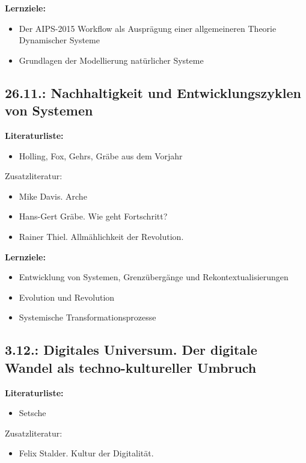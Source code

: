 \documentclass[11pt,a4paper]{article}
\begin{document}
\textbf{Lernziele:}
\begin{itemize}[noitemsep]
\item Der AIPS-2015 Workflow als Ausprägung einer allgemeineren Theorie
  Dynamischer Systeme 
\item Grundlagen der Modellierung natürlicher Systeme
\end{itemize}

\subsection{26.11.: Nachhaltigkeit und Entwicklungszyklen von Systemen}

\textbf{Literaturliste:}
\begin{itemize}[noitemsep]
\item Holling, Fox, Gehrs, Gräbe aus dem Vorjahr
\end{itemize}

Zusatzliteratur:
\begin{itemize}[noitemsep]
\item Mike Davis. Arche
\item Hans-Gert Gräbe. Wie geht Fortschritt?
\item Rainer Thiel. Allmählichkeit der Revolution.
\end{itemize}

\textbf{Lernziele:}
\begin{itemize}[noitemsep]
\item Entwicklung von Systemen, Grenzübergänge und Rekontextualisierungen 
\item Evolution und Revolution
\item Systemische Transformationsprozesse
\end{itemize}

\subsection{3.12.: Digitales Universum. Der digitale Wandel als
  techno-kultureller Umbruch}

\textbf{Literaturliste:}
\begin{itemize}[noitemsep]
\item Setsche
\end{itemize}

Zusatzliteratur:
\begin{itemize}[noitemsep]
\item Felix Stalder. Kultur der Digitalität.
\end{itemize}
\end{document}
